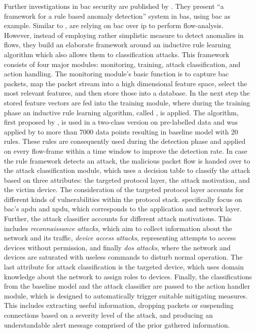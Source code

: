 Further investigations in \gls{bac} security are published by \textcite{Pan2014}. They present \enquote{a framework for a rule based anomaly detection} system in \gls{bas}, using \gls{bac} as example.
Similar to \textcite{Celeda2012}, \textcite{Pan2014} are relying on \gls{bac} over \gls{ip} to perform flow-analysis.
However, instead of employing rather simplistic measure to detect anomalies in flows, they build an elaborate framework around an inductive rule learning algorithm which also allows them to classification attacks.
This framework consists of four major modules: monitoring, training, attack classification, and action handling.
The monitoring module's basic function is to capture \gls{bac} packets, map the packet stream into a high dimensional feature space, select the most relevant features, and then store those into a database.
In the next step the stored feature vectors are fed into the training module, where during the training phase an inductive rule learning algorithm, called , is applied.
The algorithm, first proposed by \textcite{Cohen1995}, is used in a two-class version on pre-labelled data and was applied by \textcite{Pan2014} to more than 7000 data points resulting in baseline model with 20 rules.
These rules are consequently used during the detection phase and applied on every flow-frame within a time window to improve the detection rate.
In case the rule framework detects an attack, the malicious packet flow is handed over to the attack classification module, which uses a decision table to classify the attack based on three attributes: the targeted protocol layer, the attack motivation, and the victim device.
The consideration of the targeted protocol layer accounts for different kinds of vulnerabilities within the protocol stack. \textcite{Pan2014} specifically focus on \gls{bac}'s \gls{apdu} and \gls{npdu}, which corresponds to the application and network layer.
Further, the attack classifier accounts for different attack motivations. This includes \emph{reconnaissance attacks}, which aim to collect information about the network and its traffic, \emph{device access attacks}, representing attempts to access devices without permission, and finally \emph{\gls{dos} attacks}, where the network and devices are saturated with useless commands to disturb normal operation.
The last attribute for attack classification is the targeted device, which uses domain knowledge about the network to assign roles to devices.
Finally, the classifications from the baseline model and the attack classifier are passed to the action handler module, which is designed to automatically trigger suitable mitigating measures. This includes extracting useful information, dropping packets or suspending connections based on a severity level of the attack, and producing an understandable alert message comprised of the prior gathered information.

